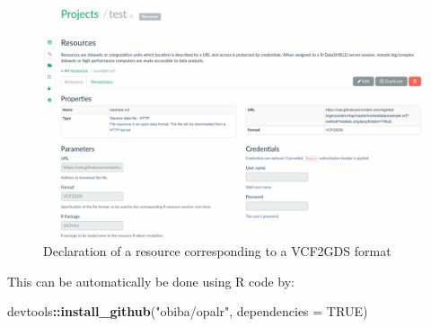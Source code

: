 \documentclass[]{article}
\newenvironment{Shaded}{\begin{snugshade}}{\end{snugshade}}
\newcommand{\DataTypeTok}[1]{\textcolor[rgb]{0.13,0.29,0.53}{#1}}
\newcommand{\KeywordTok}[1]{\textcolor[rgb]{0.13,0.29,0.53}{\textbf{#1}}}
\newcommand{\NormalTok}[1]{#1}
\newcommand{\OperatorTok}[1]{\textcolor[rgb]{0.81,0.36,0.00}{\textbf{#1}}}
\newcommand{\OtherTok}[1]{\textcolor[rgb]{0.56,0.35,0.01}{#1}}
\newcommand{\StringTok}[1]{\textcolor[rgb]{0.31,0.60,0.02}{#1}}
\begin{document}
\begin{figure}

{\centering \includegraphics[width=28.14in]{fig/opal_resources_API} 

}

\caption{Declaration of a resource corresponding to a VCF2GDS format}\label{fig:testDeclaration}
\end{figure}

This can be automatically be done using R code by:

\begin{Shaded}
\begin{Highlighting}[]
\NormalTok{devtools}\OperatorTok{::}\KeywordTok{install\_github}\NormalTok{(}\StringTok{"obiba/opalr"}\NormalTok{, }\DataTypeTok{dependencies =} \OtherTok{TRUE}\NormalTok{)}
\end{Highlighting}
\end{Shaded}
\end{document}
